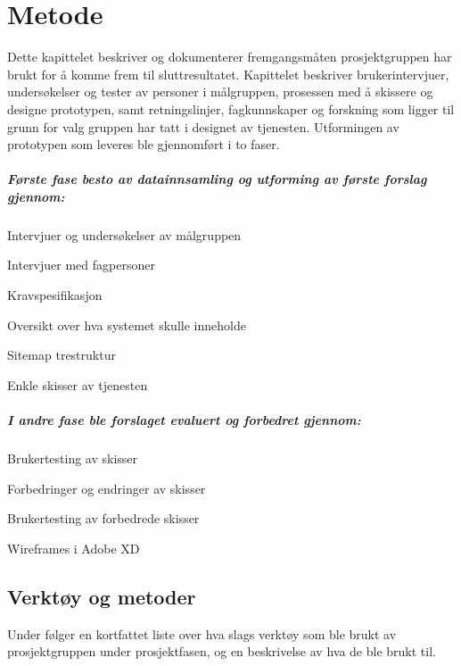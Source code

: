 \cleardoublepage
\chapter{Metode}
\label{chap:method}

Dette kapittelet beskriver og dokumenterer fremgangsmåten prosjektgruppen har brukt for å komme frem til sluttresultatet. Kapittelet beskriver brukerintervjuer, undersøkelser og tester av personer i målgruppen, prosessen med å skissere og designe prototypen, samt retningslinjer, fagkunnskaper og forskning som ligger til grunn for valg gruppen har tatt i designet av tjenesten. Utformingen av prototypen som leveres ble gjennomført i to faser.

\paragraph{Første fase besto av datainnsamling og utforming av første forslag gjennom:}
\begin{compactitem}
\item Intervjuer og undersøkelser av målgruppen
\item Intervjuer med fagpersoner
\item Kravspesifikasjon
\item Oversikt over hva systemet skulle inneholde
\item Sitemap trestruktur
\item Enkle skisser av tjenesten
\end{compactitem}

\paragraph{I andre fase ble forslaget evaluert og forbedret gjennom:}
\begin{compactitem}
\item Brukertesting av skisser
\item Forbedringer og endringer av skisser
\item Brukertesting av forbedrede skisser
\item Wireframes i Adobe XD
\end{compactitem}

\newpage
\section{Verktøy og metoder}
Under følger en kortfattet liste over hva slags verktøy som ble brukt av prosjektgruppen under prosjektfasen, og en beskrivelse av hva de ble brukt til.

